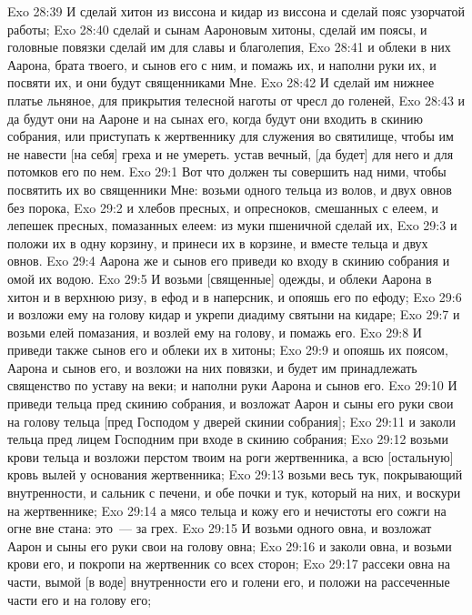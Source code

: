 \rsbpar\vs Exo 28:39 И сделай хитон из виссона и кидар из виссона и сделай пояс узорчатой работы;
\vs Exo 28:40 сделай и сынам Аароновым хитоны, сделай им поясы, и головные повязки сделай им для славы и благолепия,
\vs Exo 28:41 и облеки в них Аарона, брата твоего, и сынов его с ним, и помажь их, и наполни руки их, и посвяти их, и они будут священниками Мне.
\vs Exo 28:42 И сделай им нижнее платье льняное, для прикрытия телесной наготы от чресл до голеней,
\vs Exo 28:43 и да будут они на Аароне и на сынах его, когда будут они входить в скинию собрания, или приступать к жертвеннику для служения во святилище, чтобы им не навести [на себя] греха и не умереть.  устав вечный, [да будет] для него и для потомков его по нем.
\vs Exo 29:1 Вот что должен ты совершить над ними, чтобы посвятить их во священники Мне: возьми одного тельца из волов, и двух овнов без порока,
\vs Exo 29:2 и хлебов пресных, и опресноков, смешанных с елеем, и лепешек пресных, помазанных елеем: из муки пшеничной сделай их,
\vs Exo 29:3 и положи их в одну корзину, и принеси их в корзине, и вместе тельца и двух овнов.
\vs Exo 29:4 Аарона же и сынов его приведи ко входу в скинию собрания и омой их водою.
\vs Exo 29:5 И возьми [священные] одежды, и облеки Аарона в хитон и в верхнюю ризу, в ефод и в наперсник, и опояшь его по ефоду;
\vs Exo 29:6 и возложи ему на голову кидар и укрепи диадиму святыни на кидаре;
\vs Exo 29:7 и возьми елей помазания, и возлей ему на голову, и помажь его.
\vs Exo 29:8 И приведи также сынов его и облеки их в хитоны;
\vs Exo 29:9 и опояшь их поясом, Аарона и сынов его, и возложи на них повязки, и будет им принадлежать священство по уставу на веки; и наполни руки Аарона и сынов его.
\vs Exo 29:10 И приведи тельца пред скинию собрания, и возложат Аарон и сыны его руки свои на голову тельца [пред Господом у дверей скинии собрания];
\vs Exo 29:11 и заколи тельца пред лицем Господним при входе в скинию собрания;
\vs Exo 29:12 возьми крови тельца и возложи перстом твоим на роги жертвенника, а всю [остальную] кровь вылей у основания жертвенника;
\vs Exo 29:13 возьми весь тук, покрывающий внутренности, и сальник с печени, и обе почки и тук, который на них, и воскури на жертвеннике;
\vs Exo 29:14 а мясо тельца и кожу его и нечистоты его сожги на огне вне стана: это~---  за грех.
\vs Exo 29:15 И возьми одного овна, и возложат Аарон и сыны его руки свои на голову овна;
\vs Exo 29:16 и заколи овна, и возьми крови его, и покропи на жертвенник со всех сторон;
\vs Exo 29:17 рассеки овна на части, вымой [в воде] внутренности его и голени его, и положи  на рассеченные части его и на голову его;
